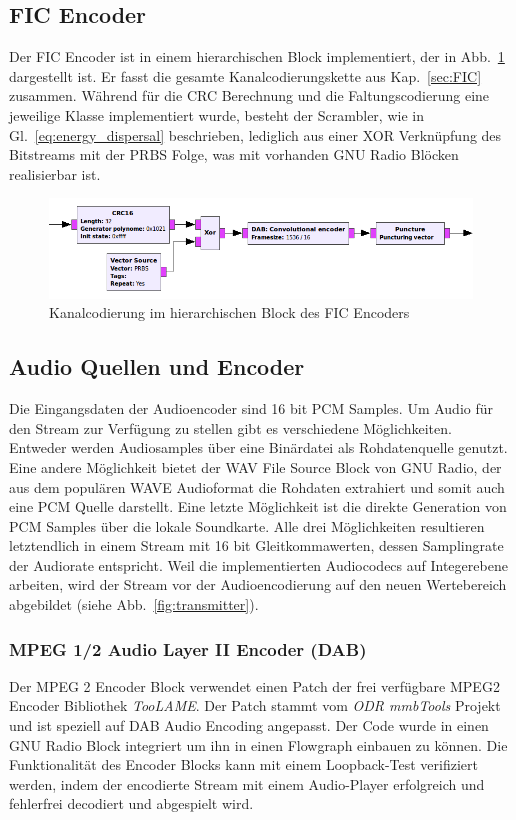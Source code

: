 \subsection{FIC Encoder}
\label{sec:fic_encoder}
Der FIC Encoder ist in einem hierarchischen Block implementiert, der in Abb.~\ref{fig:fic_encoder} dargestellt ist. Er fasst die gesamte Kanalcodierungskette aus Kap.~\ref{sec:FIC} zusammen. Während für die CRC Berechnung und die Faltungscodierung eine jeweilige Klasse implementiert wurde, besteht der Scrambler, wie in Gl.~\ref{eq:energy_dispersal} beschrieben, lediglich aus einer XOR Verknüpfung des Bitstreams mit der PRBS Folge, was mit vorhanden GNU Radio Blöcken realisierbar ist.

\begin{figure}[ht]
\centering
  \includegraphics[width=\textwidth]{figures/FIC_encoder.png}
	\caption{Kanalcodierung im hierarchischen Block des FIC Encoders}
	\label{fig:fic_encoder}
\end{figure}

\subsection{Audio Quellen und Encoder}
Die Eingangsdaten der Audioencoder sind 16 bit \ac{PCM} Samples. Um Audio für den Stream zur Verfügung zu stellen gibt es verschiedene Möglichkeiten. Entweder werden Audiosamples über eine Binärdatei als Rohdatenquelle genutzt. Eine andere Möglichkeit bietet der \glqq WAV File Source\grqq{} Block von GNU Radio, der aus dem populären \glqq WAVE\grqq{} Audioformat die Rohdaten extrahiert und somit auch eine PCM Quelle darstellt. Eine letzte Möglichkeit ist die direkte Generation von PCM Samples über die lokale Soundkarte. Alle drei Möglichkeiten resultieren letztendlich in einem Stream mit 16 bit Gleitkommawerten, dessen Samplingrate der Audiorate entspricht. Weil die implementierten Audiocodecs auf Integerebene arbeiten, wird der Stream vor der Audioencodierung auf den neuen Wertebereich abgebildet (siehe Abb.~\ref{fig:transmitter}).

\subsubsection{MPEG 1/2 Audio Layer II Encoder (DAB)}
Der MPEG 2 Encoder Block verwendet einen Patch der frei verfügbare MPEG2 Encoder Bibliothek \textit{TooLAME}. Der Patch stammt vom \textit{ODR mmbTools} Projekt \cite{repo:odr_audioenc} und ist speziell auf DAB Audio Encoding angepasst. Der Code wurde in einen GNU Radio Block integriert um ihn in einen Flowgraph einbauen zu können. Die Funktionalität des Encoder Blocks kann mit einem Loopback-Test verifiziert werden, indem der encodierte Stream mit einem Audio-Player erfolgreich und fehlerfrei decodiert und abgespielt wird.

